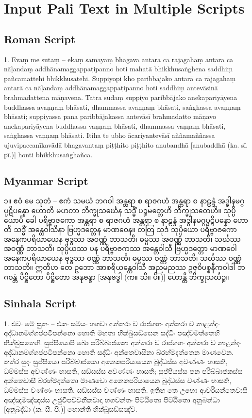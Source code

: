 \chapter{Input Pali Text in Multiple Scripts}

\starthere

\section{Roman Script}
1. Evaṃ me sutaṃ – ekaṃ samayaṃ bhagavā antarā ca rājagahaṃ antarā ca nāḷandaṃ addhānamaggappaṭipanno hoti mahatā bhikkhusaṅghena saddhiṃ pañcamattehi bhikkhusatehi. Suppiyopi kho paribbājako antarā ca rājagahaṃ antarā ca nāḷandaṃ addhānamaggappaṭipanno hoti saddhiṃ antevāsinā brahmadattena māṇavena. Tatra sudaṃ suppiyo paribbājako anekapariyāyena buddhassa avaṇṇaṃ bhāsati, dhammassa avaṇṇaṃ bhāsati, saṅghassa avaṇṇaṃ bhāsati; suppiyassa pana paribbājakassa antevāsī brahmadatto māṇavo anekapariyāyena buddhassa vaṇṇaṃ bhāsati, dhammassa vaṇṇaṃ bhāsati, saṅghassa vaṇṇaṃ bhāsati. Itiha te ubho ācariyantevāsī aññamaññassa ujuvipaccanīkavādā bhagavantaṃ piṭṭhito piṭṭhito anubandhā [anubaddhā (ka. sī. pī.)] honti bhikkhusaṅghañca.

\section{Myanmar Script}
၁။ ဧဝံ မေ သုတံ – ဧကံ သမယံ ဘဂဝါ အန္တရာ စ ရာဇဂဟံ အန္တရာ စ နာဠန္ဒံ အဒ္ဓါနမဂ္ဂပ္ပဋိပန္နော ဟောတိ မဟတာ ဘိက္ခုသင်္ဃေန သဒ္ဓိံ ပဉ္စမတ္တေဟိ ဘိက္ခုသတေဟိ။ သုပ္ပိယောပိ ခေါ ပရိဗ္ဗာဇကော အန္တရာ စ ရာဇဂဟံ အန္တရာ စ နာဠန္ဒံ အဒ္ဓါနမဂ္ဂပ္ပဋိပန္နော ဟောတိ သဒ္ဓိံ အန္တေဝါသိနာ ဗြဟ္မဒတ္တေန မာဏဝေန။ တတြ သုဒံ သုပ္ပိယော ပရိဗ္ဗာဇကော အနေကပရိယာယေန ဗုဒ္ဓဿ အဝဏ္ဏံ ဘာသတိ၊ ဓမ္မဿ အဝဏ္ဏံ ဘာသတိ၊ သင်္ဃဿ အဝဏ္ဏံ ဘာသတိ၊ သုပ္ပိယဿ ပန ပရိဗ္ဗာဇကဿ အန္တေဝါသီ ဗြဟ္မဒတ္တော မာဏဝေါ အနေကပရိယာယေန ဗုဒ္ဓဿ ဝဏ္ဏံ ဘာသတိ၊ ဓမ္မဿ ဝဏ္ဏံ ဘာသတိ၊ သင်္ဃဿ ဝဏ္ဏံ ဘာသတိ။ ဣတိဟ တေ ဥဘော အာစရိယန္တေဝါသီ အညမညဿ ဥဇုဝိပစ္စနီကဝါဒါ ဘဂဝန္တံ ပိဋ္ဌိတော ပိဋ္ဌိတော အနုဗန္ဓာ [အနုဗဒ္ဓါ (က။ သီ။ ပီ။)] ဟောန္တိ ဘိက္ခုသင်္ဃဉ္စ။

\section{Sinhala Script}
1. එවං මෙ සුතං – එකං සමයං භගවා අන්තරා ච රාජගහං අන්තරා ච නාළන්දං අද්ධානමග්ගප්පටිපන්නො හොති මහතා භික්ඛුසඞ්ඝෙන සද්ධිං පඤ්චමත්තෙහි භික්ඛුසතෙහි. සුප්පියොපි ඛො පරිබ්බාජකො අන්තරා ච රාජගහං අන්තරා ච නාළන්දං අද්ධානමග්ගප්පටිපන්නො හොති සද්ධිං අන්තෙවාසිනා බ්රහ්මදත්තෙන මාණවෙන. තත්ර සුදං සුප්පියො පරිබ්බාජකො අනෙකපරියායෙන බුද්ධස්ස අවණ්ණං භාසති, ධම්මස්ස අවණ්ණං භාසති, සඞ්ඝස්ස අවණ්ණං භාසති; සුප්පියස්ස පන පරිබ්බාජකස්ස අන්තෙවාසී බ්රහ්මදත්තො මාණවො අනෙකපරියායෙන බුද්ධස්ස වණ්ණං භාසති, ධම්මස්ස වණ්ණං භාසති, සඞ්ඝස්ස වණ්ණං භාසති. ඉතිහ තෙ උභො ආචරියන්තෙවාසී අඤ්ඤමඤ්ඤස්ස උජුවිපච්චනීකවාදා භගවන්තං පිට්ඨිතො පිට්ඨිතො අනුබන්ධා [අනුබද්ධා (ක. සී. පී.)] හොන්ති භික්ඛුසඞ්ඝඤ්ච.

